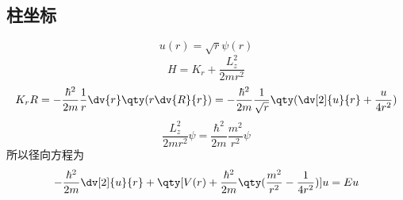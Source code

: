 \subsection{柱坐标}
\begin{equation}
u(r) = \sqrt r \psi (r)
\end{equation}
\begin{equation}
 H = K_r + \frac{L_z^2}{2m r^2}
\end{equation}
\begin{equation}
K_r R = -\frac{\hbar^2}{2m} \frac1r \dv{r} \qty(r \dv{R}{r}) =  - \frac{\hbar^2}{2m} \frac{1}{\sqrt r} \qty(\dv[2]{u}{r} + \frac{u}{4 r^2})
\end{equation}
\begin{equation}
\frac{L_z^2}{2m r^2}\psi  = \frac{\hbar^2}{2m} \frac{m^2}{r^2}\psi 
\end{equation}
所以径向方程为
\begin{equation}
- \frac{\hbar^2}{2m} \dv[2]{u}{r} + \qty[V(r) + \frac{\hbar^2}{2m} \qty(\frac{m^2}{r^2} - \frac{1}{4 r^2})]u = Eu
\end{equation}

